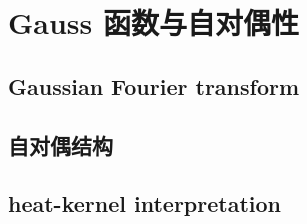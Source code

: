 \section{Gauss 函数与自对偶性}
\label{b2:sec:0602}


\subsection{Gaussian Fourier transform}
\label{b2:subsec:060201}

\subsection{自对偶结构}
\label{b2:subsec:060202}

\subsection{heat-kernel interpretation}
\label{b2:subsec:060203}


